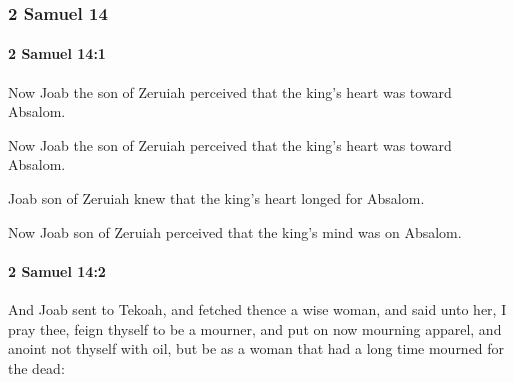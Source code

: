 	\subsubsection{2 Samuel 14} %
		\label{2SAMUEL-14}

		\paragraph{2 Samuel 14:1} %
			\label{2SAMUEL-14-1}

			Now Joab the son of Zeruiah perceived that the king’s heart was toward Absalom.

			\begin{versebox}
					\item[BHS] 
					\item[ASV] Now Joab the son of Zeruiah perceived that the king's heart was toward Absalom.
					\item[NIV] Joab son of Zeruiah knew that the king’s heart longed for Absalom.
					\item[NRSV] Now Joab son of Zeruiah perceived that the king’s mind was on Absalom.
			\end{versebox}

		\paragraph{2 Samuel 14:2} %
			\label{2SAMUEL-14-2}

			And Joab sent to Tekoah, and fetched thence a wise woman, and said unto her, I pray thee, feign thyself to be a mourner, and put on now mourning apparel, and anoint not thyself with oil, but be as a woman that had a long time mourned for the dead:

